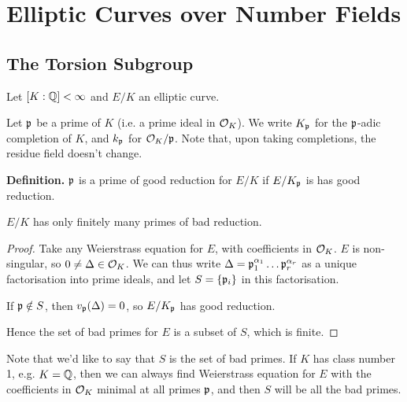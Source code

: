 \documentclass[10pt,a4paper]{article}
\begin{document}
\section{Elliptic Curves over Number Fields}
\subsection{The Torsion Subgroup}
Let $[K:\mathbb{Q}]<\infty$ and $E/K$ an elliptic curve.

Let $\mathfrak{p}$ be a prime of $K$ (i.e. a prime ideal in $\mathcal{O}_K$). We write $K_{\mathfrak{p}}$ for the $\mathfrak{p}$-adic completion of $K$, and $k_{\mathfrak{p}}$ for $\mathcal{O}_K/\mathfrak{p}$. Note that, upon taking completions, the residue field doesn't change.

\textbf{Definition.} $\mathfrak{p}$ is a prime of good reduction for $E/K$ if $E/K_{\mathfrak{p}}$ is has good reduction.

\begin{lemma}
  $E/K$ has only finitely many primes of bad reduction.
\end{lemma}
\begin{proof}
  Take any Weierstrass equation for $E$, with coefficients in $\mathcal{O}_K$. $E$ is non-singular, so $0 \neq \Delta \in \mathcal{O}_K$. We can thus write $\Delta = \mathfrak{p}_1^{\alpha_1}\ldots \mathfrak{p}_r^{\alpha_r}$ as a unique factorisation into prime ideals, and let $S = \{\mathfrak{p}_i\}$ in this factorisation.

  If $\mathfrak{p} \notin S$, then $v_{\mathfrak{p}}(\Delta) = 0$, so $E/K_{\mathfrak{p}}$ has good reduction.

  Hence the set of bad primes for $E$ is a subset of $S$, which is finite.
\end{proof}
Note that we'd like to say that $S$ is the set of bad primes. If $K$ has class number 1, e.g. $K=\mathbb{Q}$, then we can always find Weierstrass equation for $E$ with the coefficients in $\mathcal{O}_K$ minimal at all primes $\mathfrak{p}$, and then $S$ will be all the bad primes.
\end{document}
